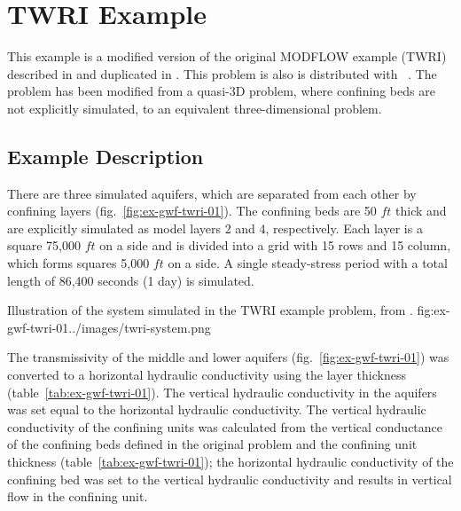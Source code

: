 \section{TWRI Example}

This example is a modified version of the original MODFLOW example (TWRI) described in \cite{modflow88} and duplicated in \cite{harbaugh1996user}. This problem is also is distributed with \mff~\citep{modflow2005}. The problem has been modified from a quasi-3D problem, where confining beds are not explicitly simulated, to an equivalent three-dimensional problem.

\subsection{Example Description}
There are three simulated aquifers, which are separated from each other by confining layers (fig.~\ref{fig:ex-gwf-twri-01}). The confining beds are 50 $ft$ thick and are explicitly simulated as model layers 2 and 4, respectively. Each layer is a square 75,000 $ft$ on a side and is divided into a grid with 15 rows and 15 column, which forms squares 5,000 $ft$ on a side. A single steady-stress period with a total length of 86,400 seconds (1 day) is simulated.

\begin{StandardFigure}{
                                     Illustration of the system simulated in the TWRI example problem, from \cite{modflow88}.
                                     }{fig:ex-gwf-twri-01}{../images/twri-system.png}
\end{StandardFigure}                                 

The transmissivity of the middle and lower aquifers (fig.~\ref{fig:ex-gwf-twri-01}) was converted to a horizontal hydraulic conductivity using the layer thickness (table~\ref{tab:ex-gwf-twri-01}). The vertical hydraulic conductivity in the aquifers was set equal to the horizontal hydraulic conductivity. The vertical hydraulic conductivity of the confining units was calculated from the vertical conductance of the confining beds defined in the original problem and the confining unit thickness (table~\ref{tab:ex-gwf-twri-01}); the horizontal hydraulic conductivity of the confining bed was set to the vertical hydraulic conductivity and results in vertical flow in the confining unit.




